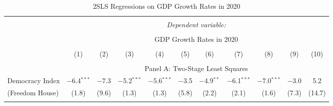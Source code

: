 
\begin{table}[!htbp] 
  \caption{2SLS Regressions on GDP Growth Rates in 2020}
  \label{tab:2sls-gdp-exclude-US-China} 
  \footnotesize
  \begin{threeparttable}
\begin{tabular}{@{\extracolsep{0pt}}lcccccccccc} 
\\[-1.8ex]\hline 
\hline \\[-1.8ex] 
 & \multicolumn{10}{c}{\textit{Dependent variable:}} \\ 
\cline{2-11} 
\\[-1.8ex] & \multicolumn{10}{c}{GDP Growth Rates in 2020} \\ 
\\[-1.8ex] & (1) & (2) & (3) & (4) & (5) & (6) & (7) & (8) & (9) & (10)\\ 
\hline \\[-1.8ex] 

  & \multicolumn{10}{c}{Panel A: Two-Stage Least Squares} \\
 Democracy Index  & $-$6.4$^{***}$ & $-$7.3 & $-$5.2$^{***}$ & $-$5.6$^{***}$ & $-$3.5 & $-$4.9$^{**}$ & $-$6.1$^{***}$ & $-$7.0$^{***}$ & $-$3.0 & 5.2 \\ 
 (Freedom House) & (1.8) & (9.6) & (1.3) & (1.3) & (5.8) & (2.2) & (2.1) & (1.6) & (7.3) & (14.7) \\ 
 \hline \\[-1.8ex] 
 

\end{tabular}
\end{threeparttable}
\end{table}
